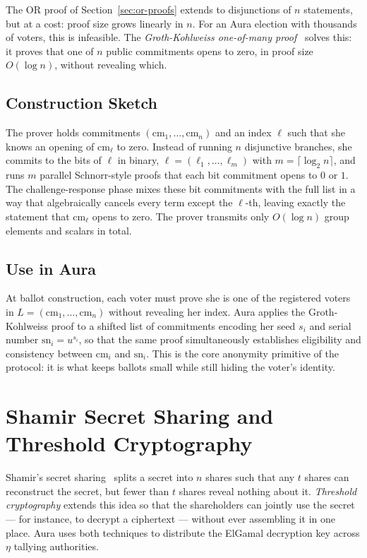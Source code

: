 \documentclass[12pt,a4paper,oneside]{report}
\begin{document}
The OR proof of Section~\ref{sec:or-proofs} extends to disjunctions of $n$ 
statements, but at a cost: proof size grows linearly in $n$. For an Aura 
election with thousands of voters, this is infeasible. The 
\textit{Groth-Kohlweiss one-of-many proof}~\cite{groth-kohlweiss} solves 
this: it proves that one of $n$ public commitments opens to zero, in 
proof size $O(\log n)$, without revealing which.

\subsection*{Construction Sketch}
The prover holds commitments $(\text{cm}_1, \ldots, \text{cm}_n)$ and 
an index $\ell$ such that she knows an opening of $\text{cm}_\ell$ to 
zero. Instead of running $n$ disjunctive branches, she commits to the 
bits of $\ell$ in binary, $\ell = (\ell_1, \ldots, \ell_m)$ with 
$m = \lceil \log_2 n \rceil$, and runs $m$ parallel Schnorr-style proofs 
that each bit commitment opens to $0$ or $1$. The challenge-response 
phase mixes these bit commitments with the full list in a way that 
algebraically cancels every term except the $\ell$-th, leaving exactly 
the statement that $\text{cm}_\ell$ opens to zero. The prover transmits 
only $O(\log n)$ group elements and scalars in total.

\subsection*{Use in Aura}
At ballot construction, each voter must prove she is one of the registered 
voters in $L = (\text{cm}_1, \ldots, \text{cm}_n)$ without revealing her 
index. Aura applies the Groth-Kohlweiss proof to a shifted list of 
commitments encoding her seed $s_i$ and serial number 
$\text{sn}_i = u^{s_i}$, so that the same proof simultaneously establishes 
eligibility and consistency between $\text{cm}_i$ and $\text{sn}_i$. This 
is the core anonymity primitive of the protocol: it is what keeps ballots 
small while still hiding the voter's identity.
\section{Shamir Secret Sharing and Threshold Cryptography}
\label{sec:threshold}

Shamir's secret sharing~\cite{shamir} splits a secret into $n$ shares 
such that any $t$ shares can reconstruct the secret, but fewer than $t$ 
shares reveal nothing about it. \textit{Threshold cryptography} extends 
this idea so that the shareholders can jointly use the secret --- for 
instance, to decrypt a ciphertext --- without ever assembling it in one 
place. Aura uses both techniques to distribute the ElGamal decryption 
key across $\eta$ tallying authorities.
\end{document}
